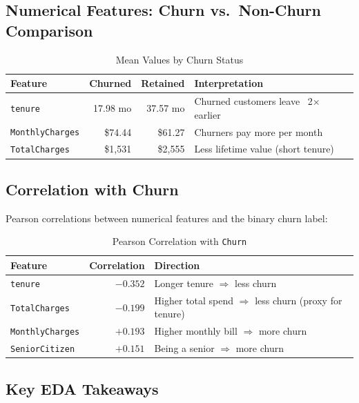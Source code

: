 \documentclass[12pt,a4paper]{article}
\begin{document}
\subsection{Numerical Features: Churn vs.\ Non-Churn Comparison}

\begin{table}[H]
\centering
\caption{Mean Values by Churn Status}
\begin{tabular}{lrrl}
    \toprule
    \textbf{Feature} & \textbf{Churned} & \textbf{Retained} & \textbf{Interpretation} \\
    \midrule
    \texttt{tenure}           & 17.98 mo  & 37.57 mo  & Churned customers leave ~2× earlier \\
    \texttt{MonthlyCharges}   & \$74.44   & \$61.27   & Churners pay more per month \\
    \texttt{TotalCharges}     & \$1,531   & \$2,555   & Less lifetime value (short tenure) \\
    \bottomrule
\end{tabular}
\end{table}

\subsection{Correlation with Churn}

Pearson correlations between numerical features and the binary churn label:

\begin{table}[H]
\centering
\caption{Pearson Correlation with \texttt{Churn}}
\begin{tabular}{lrl}
    \toprule
    \textbf{Feature} & \textbf{Correlation} & \textbf{Direction} \\
    \midrule
    \texttt{tenure}           & $-0.352$ & Longer tenure $\Rightarrow$ less churn \\
    \texttt{TotalCharges}     & $-0.199$ & Higher total spend $\Rightarrow$ less churn (proxy for tenure) \\
    \texttt{MonthlyCharges}   & $+0.193$ & Higher monthly bill $\Rightarrow$ more churn \\
    \texttt{SeniorCitizen}    & $+0.151$ & Being a senior $\Rightarrow$ more churn \\
    \bottomrule
\end{tabular}
\end{table}

\subsection{Key EDA Takeaways}
\end{document}
